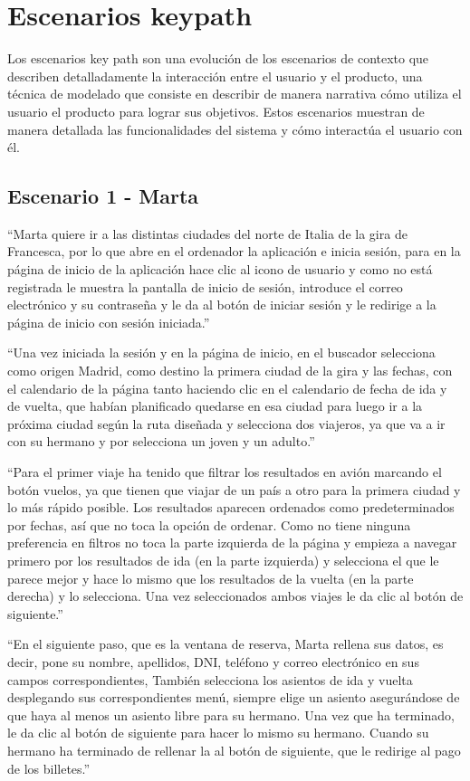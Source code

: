 \section{Escenarios keypath}

Los escenarios key path son una evolución de los escenarios de contexto que describen detalladamente la interacción entre el usuario y el producto, una técnica de modelado que consiste en describir de manera narrativa cómo utiliza el usuario el producto para lograr sus objetivos. Estos escenarios muestran de manera detallada las funcionalidades del sistema y cómo interactúa el usuario con él.

\subsection{Escenario 1 - Marta}

``Marta quiere ir a las distintas ciudades del norte de Italia de la gira de Francesca, por lo que abre en el ordenador la aplicación e inicia sesión, para en la página de inicio de la aplicación hace clic al icono de usuario y como no está registrada le muestra la pantalla de inicio de sesión, introduce el correo electrónico y su contraseña y le da al botón de iniciar sesión y le redirige a la página de inicio con sesión iniciada.''

``Una vez iniciada la sesión y en la página de inicio, en el buscador selecciona como origen Madrid, como destino la primera ciudad de la gira y las fechas, con el calendario de la página tanto haciendo clic en el calendario de fecha de ida y de vuelta, que habían planificado quedarse en esa ciudad para luego ir a la próxima ciudad según la ruta diseñada y selecciona dos viajeros, ya que va a ir con su hermano y por selecciona un joven y un adulto.''

``Para el primer viaje ha tenido que filtrar los resultados en avión marcando el botón vuelos, ya que tienen que viajar de un país a otro para la primera ciudad y lo más rápido posible. Los resultados aparecen ordenados como predeterminados por fechas, así que no toca la opción de ordenar. Como no tiene ninguna preferencia en filtros no toca la parte izquierda de la página y empieza a navegar primero por los resultados de ida (en la parte izquierda) y selecciona el que le parece mejor y hace lo mismo que los resultados de la vuelta (en la parte derecha) y lo selecciona. Una vez seleccionados ambos viajes le da clic al botón de siguiente.''

``En el siguiente paso, que es la ventana de reserva, Marta rellena sus datos, es decir, pone su nombre, apellidos, DNI, teléfono y correo electrónico en sus campos correspondientes, También selecciona los asientos de ida y vuelta desplegando sus correspondientes menú, siempre elige un asiento asegurándose de que haya al menos un asiento libre para su hermano. Una vez que ha terminado, le da clic al botón de siguiente para hacer lo mismo su hermano. Cuando su hermano ha terminado de rellenar la al botón de siguiente, que le redirige al pago de los billetes.''


